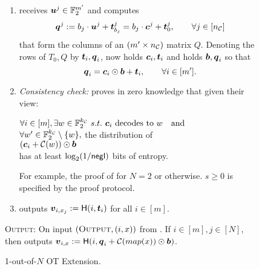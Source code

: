 \begin{figure}[t!]
{\begin{minipage}{0.95\linewidth}
\begin{enumerate}
				\item\label{step:extCompQ} \send receives $\boldsymbol{u}^j\in\mathbb{F}^{m'}_2$ and computes
				$$
				\boldsymbol{q}^j := b_j \cdot \boldsymbol{u}^j +\boldsymbol{t}^j_{b_j} = b_j\cdot \boldsymbol{c}^j+\boldsymbol{t}^j_0,\qquad \forall j\in[{n_\mathcal{C}}]
				$$
				that form the columns of an $(m'\times {n_\mathcal{C}})$ matrix $Q$. Denoting the rows of $T_0, Q$ by $\boldsymbol{t}_i,\boldsymbol{q}_i$, \rec now holds $\boldsymbol{c}_i,\boldsymbol{t}_i$ and \send holds $\boldsymbol{b}, \boldsymbol{q}_i$ so that 
				$$
				\boldsymbol{q}_i = \boldsymbol{c}_i\odot \boldsymbol{b}+\boldsymbol{t}_i,\qquad \forall i\in[m'].
				$$
				
				\item \emph{Consistency check:}\label{step:consistency} \rec  proves in zero knowledge that given their view:
				\begin{center}
					$	\forall i\in[m], \exists w\in\mathbb{F}^{{k_\mathcal{C}}}_2\  s.t.\  \boldsymbol{c}_i \text{ decodes to } w \quad  \text{and}$ \\
					$\forall w'\in\mathbb{F}^{{k_\mathcal{C}}}_2\setminus\{w\},$ the distribution of \\
					$(\boldsymbol{c}_i+\mathcal{C}(w))\odot \boldsymbol{b}$\\      
					has at least $\log_2(1/\mathsf{negl})$ bits of entropy.
				\end{center}
				
				 For example, the proof of \cite{C:KelOrsSch15} for $N=2$ or \cite{RSA:OrrOrsSch17} otherwise. $s\geq0$ is specified by the proof protocol.
%					
%					
				\item \rec outputs $\boldsymbol{v}_{i, x_j}:=\mathsf{H}(i,\boldsymbol{t}_i)$ for all $i\in[m]$.
			\end{enumerate}
			
			
			\textsc{Output:} On input $(\textsc{Output}, (i,x))$ from \send. If $i\in[m],j\in[N]$, then \send outputs $\boldsymbol{v}_{i,x}:=\mathsf{H}(i,\boldsymbol{q}_i+\mathcal{C}(map(x))\odot \boldsymbol{b})$.
	\end{minipage}}
	\caption{ 1-out-of-$N$ OT Extension.}
	\label{fig:otExt}
\end{figure}


